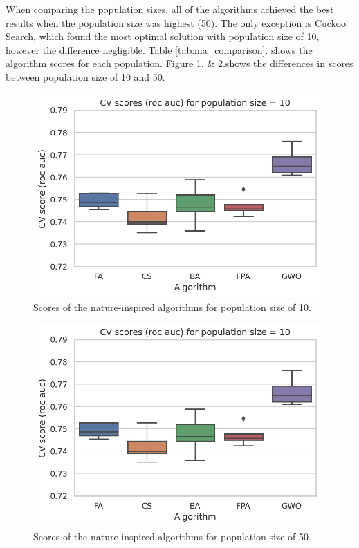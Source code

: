 \documentclass[runningheads]{llncs}
\begin{document}
When comparing the population sizes, all of the algorithms achieved the best results when the population size was highest (50). The only exception is Cuckoo Search, which found the most optimal solution with population size of 10, however the difference negligible. Table \ref{tab:nia_comparison}. shows the algorithm scores for each population. Figure \ref{fig:nia_train_score_by_algorithm_1}. \& \ref{fig:nia_train_score_by_algorithm_2}.shows the differences in scores between population size of 10 and 50.


\begin{figure}
    \centering
    \includegraphics[width=11cm]{figures/nia_train_score_by_algorithm_10}
    \caption{Scores of the nature-inspired algorithms for population size of 10.}
    \label{fig:nia_train_score_by_algorithm_1}
\end{figure}

\begin{figure}
    \centering
    \includegraphics[width=11cm]{figures/nia_train_score_by_algorithm_10}
    \caption{Scores of the nature-inspired algorithms for population size of 50.}
    \label{fig:nia_train_score_by_algorithm_2}
\end{figure}
\end{document}
